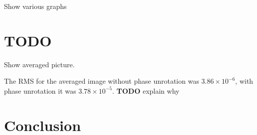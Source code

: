 \documentclass{article}
\newcommand*{\TODO}{\textbf{TODO}\xspace}
\begin{document}
Show various graphs

\section*{TODO}

Show averaged picture.

The RMS for the averaged image without phase unrotation was $3.86 \times 10^{-6}$, with phase unrotation it was $3.78 \times 10^{-5}$. \TODO explain why

\section*{Conclusion}

\newpage
\appendix

\newpage


\end{document}

